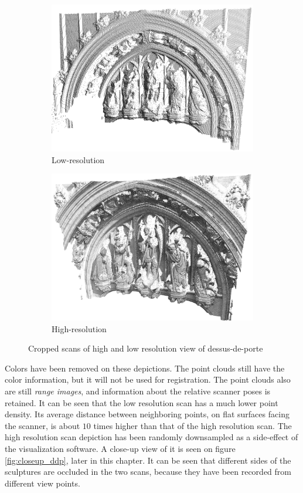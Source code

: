\begin{figure}[h]
\centering
\begin{subfigure}{.5\textwidth}
\includegraphics[width=\linewidth]{fig/ddp_LO.png}
\caption{Low-resolution}
\end{subfigure}%
\begin{subfigure}{.5\textwidth}
\includegraphics[width=\linewidth]{fig/ddp_HI.png}
\caption{High-resolution}
\end{subfigure}
\caption{Cropped scans of high and low resolution view of dessus-de-porte}
\label{fig:ddp_hilo}
\end{figure}

Colors have been removed on these depictions. The point clouds still have the color information, but it will not be used for registration. The point clouds also are still \emph{range images}, and information about the relative scanner poses is retained. It can be seen that the low resolution scan has a much lower point density. Its average distance between neighboring points, on flat surfaces facing the scanner, is about $10$ times higher than that of the high resolution scan. The high resolution scan depiction has been randomly downsampled as a side-effect of the visualization software. A close-up view of it is seen on figure \ref{fig:closeup_ddp}, later in this chapter. It can be seen that different sides of the sculptures are occluded in the two scans, because they have been recorded from different view points.

